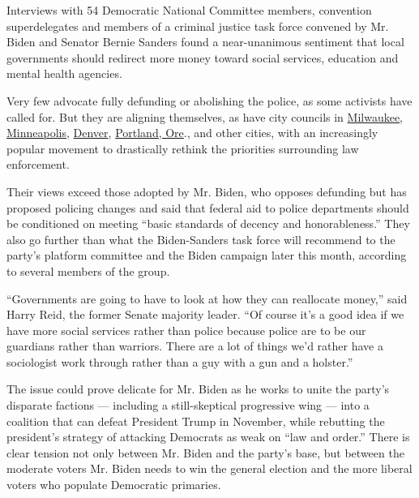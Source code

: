 Interviews with 54 Democratic National Committee members, convention
superdelegates and members of a criminal justice task force convened by
Mr. Biden and Senator Bernie Sanders found a near-unanimous sentiment
that local governments should redirect more money toward social
services, education and mental health agencies.

Very few advocate fully defunding or abolishing the police, as some
activists have called for. But they are aligning themselves, as have
city councils in
\href{https://www.jsonline.com/story/news/local/milwaukee/2020/06/15/defunding-police-milwaukee-alderman-seek-model-10-budget-cut/3192133001/}{Milwaukee},
\href{https://www.nytimes3xbfgragh.onion/2020/06/07/us/minneapolis-police-abolish.html}{Minneapolis},
\href{https://kdvr.com/news/local/new-denver-program-has-clinician-paramedic-respond-to-some-mental-health-911-calls-instead-of-police/}{Denver},
\href{https://www.kgw.com/article/news/local/portland-poised-to-shift-millions-from-police-bureau-to-street-response-team/283-2535b1dc-115a-4e4d-9e3a-48d2bcaf92be}{Portland,
Ore}., and other cities, with an increasingly popular movement to
drastically rethink the priorities surrounding law enforcement.

Their views exceed those adopted by Mr. Biden, who opposes defunding but
has proposed policing changes and said that federal aid to police
departments should be conditioned on meeting ``basic standards of
decency and honorableness.'' They also go further than what the
Biden-Sanders task force will recommend to the party's platform
committee and the Biden campaign later this month, according to several
members of the group.

``Governments are going to have to look at how they can reallocate
money,'' said Harry Reid, the former Senate majority leader. ``Of course
it's a good idea if we have more social services rather than police
because police are to be our guardians rather than warriors. There are a
lot of things we'd rather have a sociologist work through rather than a
guy with a gun and a holster.''

The issue could prove delicate for Mr. Biden as he works to unite the
party's disparate factions --- including a still-skeptical progressive
wing --- into a coalition that can defeat President Trump in November,
while rebutting the president's strategy of attacking Democrats as weak
on ``law and order.'' There is clear tension not only between Mr. Biden
and the party's base, but between the moderate voters Mr. Biden needs to
win the general election and the more liberal voters who populate
Democratic primaries.

